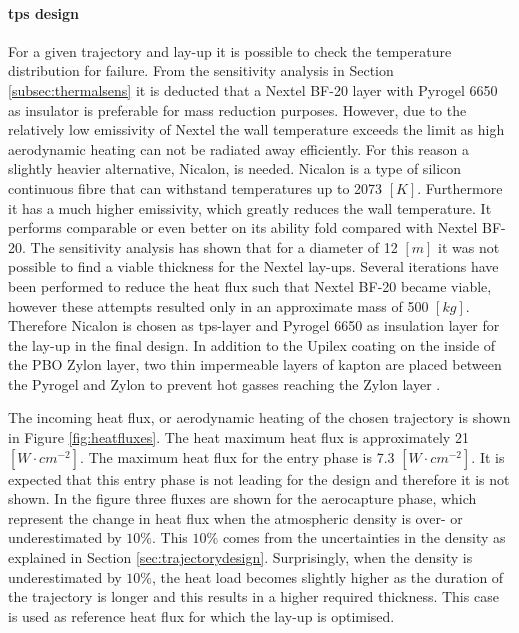 \paragraph{\acrlong{tps} design}
For a given trajectory and lay-up it is possible to check the temperature distribution for failure. From the sensitivity analysis in Section \ref{subsec:thermalsens} it is deducted that a Nextel BF-20 layer with Pyrogel 6650 as insulator is preferable for mass reduction purposes. However, due to the relatively low emissivity of Nextel the wall temperature exceeds the limit as high aerodynamic heating can not be radiated away efficiently. For this reason a slightly heavier alternative, Nicalon, is needed. Nicalon is a type of silicon continuous fibre that can withstand temperatures up to 2073 $\left[K\right]$. Furthermore it has a much higher emissivity, which greatly reduces the wall temperature. It performs comparable or even better on its ability fold compared with Nextel BF-20\cite{Corso2011}. The sensitivity analysis has shown that for a diameter of 12 $\left[m\right]$ it was not possible to find a viable thickness for the Nextel lay-ups. Several iterations have been performed to reduce the heat flux such that Nextel BF-20 became viable, however these attempts resulted only in an approximate mass of 500 $\left[kg\right]$. Therefore Nicalon is chosen as \gls{tps}-layer and Pyrogel 6650 as insulation layer for the lay-up in the final design. In addition to the Upilex coating on the inside of the PBO Zylon layer, two thin impermeable layers of kapton are placed between the Pyrogel and Zylon to prevent hot gasses reaching the Zylon layer \cite{Hughes2005,Litton2011}.

The incoming heat flux, or aerodynamic heating of the chosen trajectory is shown in Figure \ref{fig:heatfluxes}. The heat maximum heat flux is approximately 21 $\left[W\cdot cm^{-2}\right]$. The maximum heat flux for the entry phase is 7.3 $\left[W\cdot cm^{-2}\right]$. It is expected that this entry phase is not leading for the design and therefore it is not shown. In the figure three fluxes are shown for the aerocapture phase, which represent the change in heat flux when the atmospheric density is over- or underestimated by $10\%$. This $10\%$ comes from the uncertainties in the density as explained in Section \ref{sec:trajectorydesign}. Surprisingly, when the density is underestimated by $10\%$, the heat load becomes slightly higher as the duration of the trajectory is longer and this results in a higher required thickness. This case is used as reference heat flux for which the lay-up is optimised.


